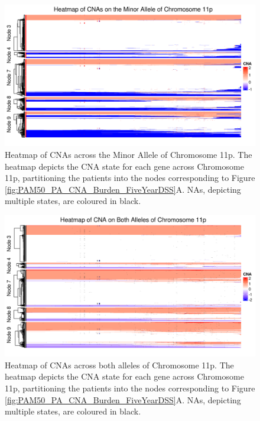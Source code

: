 \begin{figure}[!htb]
\centering
\includegraphics[width = 1\textwidth]{../figures/Chapter_6/Heatmap_Chr11p_Genes_Minor.png}
\caption[Heatmap of CNAs across the Minor Allele of Chromosome 11p.]{Heatmap of CNAs across the Minor Allele of Chromosome 11p. The heatmap depicts the CNA state for each gene across Chromosome 11p, partitioning the patients into the nodes corresponding to Figure \ref{fig:PAM50_PA_CNA_Burden_FiveYearDSS}A. NAs, depicting multiple states, are coloured in black.}
\label{fig:heatmap_Minor_11p}
\end{figure}

\begin{figure}[!htb]
\centering
\includegraphics[width = 1\textwidth]{../figures/Chapter_6/Heatmap_Chr11p_Genes_Both_Alleles.png}
\caption[Heatmap of CNAs across both alleles of Chromosome 11p.]{Heatmap of CNAs across both alleles of Chromosome 11p. The heatmap depicts the CNA state for each gene across Chromosome 11p, partitioning the patients into the nodes corresponding to Figure \ref{fig:PAM50_PA_CNA_Burden_FiveYearDSS}A. NAs, depicting multiple states, are coloured in black.}
\label{fig:heatmap_Both_11p}
\end{figure}

